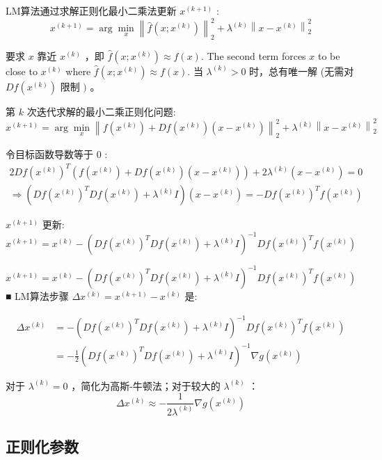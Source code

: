 LM算法通过求解正则化最小二乘法更新 $ x^{(k+1)} $ :
$$
x^{(k+1)}=\arg \min _{x}\left\|\hat{f}\left(x ; x^{(k)}\right)\right\|_{2}^{2}+\lambda^{(k)}\left\|x-x^{(k)}\right\|_{2}^{2}
$$

要求 $ x $ 靠近 $ x^{(k)} $ ，即 $ \hat{f}\left(x ; x^{(k)}\right) \approx f(x) $.
The second term forces $ x $ to be close to $ x^{(k)} $ where $ \hat{f}\left(x ; x^{(k)}\right) \approx f(x) $.
当 $ \lambda^{(k)}>0 $ 时，总有唯一解 (无需对 $Df \left(x^{(k)}\right) $ 限制 $ ) $ 。

第 $ k $ 次迭代求解的最小二乘正则化问题:
$$
x^{(k+1)}=\arg \min _{x}\left\|f\left(x^{(k)}\right)+D f\left(x^{(k)}\right)\left(x-x^{(k)}\right)\right\|_{2}^{2}+\lambda^{(k)}\left\|x-x^{(k)}\right\|_{2}^{2}
$$

令目标函数导数等于 0 :
$$
\begin{array}{l}
2 D f\left(x^{(k)}\right)^{T}\left(f\left(x^{(k)}\right)+D f\left(x^{(k)}\right)\left(x-x^{(k)}\right)\right)+2 \lambda^{(k)}\left(x-x^{(k)}\right)=0 \\
\Rightarrow\left(D f\left(x^{(k)}\right)^{T} D f\left(x^{(k)}\right)+\lambda^{(k)} I\right)\left(x-x^{(k)}\right)=-D f\left(x^{(k)}\right)^{T} f\left(x^{(k)}\right)
\end{array}
$$

$ x^{(k+1)} $ 更新:
$$
x^{(k+1)}=x^{(k)}-\left(D f\left(x^{(k)}\right)^{T} D f\left(x^{(k)}\right)+\lambda^{(k)} I\right)^{-1} D f\left(x^{(k)}\right)^{T} f\left(x^{(k)}\right)
$$

$$
x^{(k+1)}=x^{(k)}-\left(D f\left(x^{(k)}\right)^{T} D f\left(x^{(k)}\right)+\lambda^{(k)} I\right)^{-1} D f\left(x^{(k)}\right)^{T} f\left(x^{(k)}\right)
$$
■ LM算法步骤 $ \Delta x^{(k)}=x^{(k+1)}-x^{(k)} $ 是:

$$ \begin{aligned} \Delta x^{(k)} &=-\left(D f\left(x^{(k)}\right)^{T} D f\left(x^{(k)}\right)+\lambda^{(k)} I\right)^{-1} D f\left(x^{(k)}\right)^{T} f\left(x^{(k)}\right) \\ &=-\frac{1}{2}\left(D f\left(x^{(k)}\right)^{T} D f\left(x^{(k)}\right)+\lambda^{(k)} I\right)^{-1} \nabla g\left(x^{(k)}\right) \end{aligned} $$

对于 $ \lambda^{(k)}=0 $ ，简化为高斯-牛顿法；对于较大的 $ \lambda^{(k)} $ ：
$$
\Delta x^{(k)} \approx-\frac{1}{2 \lambda^{(k)}} \nabla g\left(x^{(k)}\right)
$$

\subsection{正则化参数}

